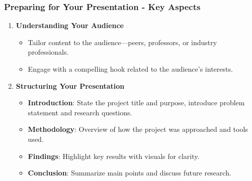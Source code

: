 \documentclass{beamer}
\begin{document}
\begin{frame}[fragile]
    \frametitle{Preparing for Your Presentation - Key Aspects}
    \begin{enumerate}
        \item \textbf{Understanding Your Audience}
        \begin{itemize}
            \item Tailor content to the audience—peers, professors, or industry professionals.
            \item Engage with a compelling hook related to the audience's interests.
        \end{itemize}
        
        \item \textbf{Structuring Your Presentation}
        \begin{itemize}
            \item \textbf{Introduction}: State the project title and purpose, introduce problem statement and research questions.
            \item \textbf{Methodology}: Overview of how the project was approached and tools used.
            \item \textbf{Findings}: Highlight key results with visuals for clarity.
            \item \textbf{Conclusion}: Summarize main points and discuss future research.
        \end{itemize}
    \end{enumerate}
\end{frame}
\end{document}
